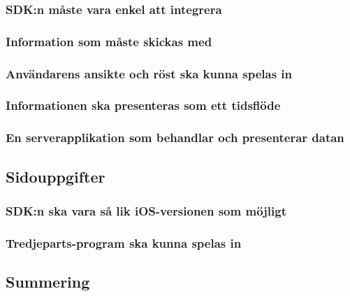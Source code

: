\subsubsection{SDK:n måste vara enkel att integrera}
\subsubsection{Information som måste skickas med}
\subsubsection{Användarens ansikte och röst ska kunna spelas in}
\subsubsection{Informationen ska presenteras som ett tidsflöde}
\subsubsection{En serverapplikation som behandlar och presenterar datan}
\subsection{Sidouppgifter}
\subsubsection{SDK:n ska vara så lik iOS-versionen som möjligt}
\subsubsection{Tredjeparts-program ska kunna spelas in}
\subsection{Summering}
